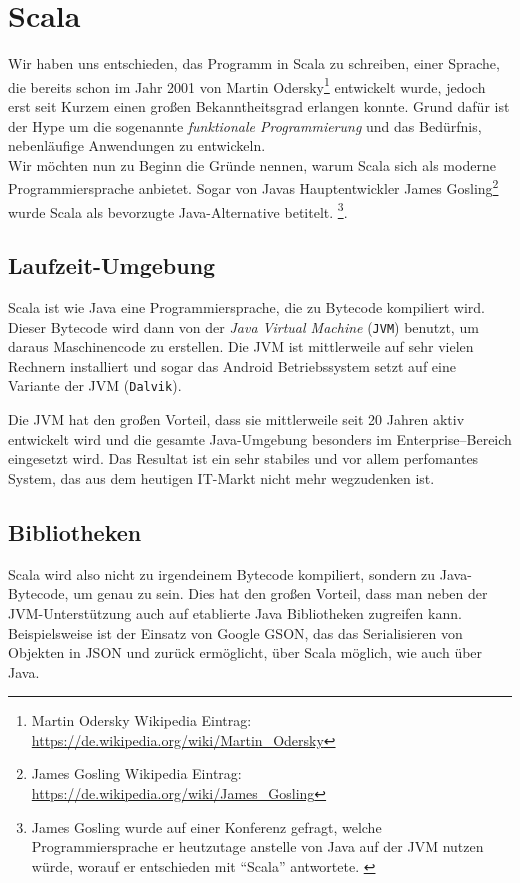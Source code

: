 \chapter{Scala}
Wir haben uns entschieden, das Programm in Scala zu schreiben, einer Sprache, die bereits schon im Jahr 2001 von Martin Odersky\footnote{Martin Odersky Wikipedia Eintrag: \url{https://de.wikipedia.org/wiki/Martin_Odersky}} entwickelt wurde, jedoch erst seit Kurzem einen großen Bekanntheitsgrad erlangen konnte. Grund dafür ist der Hype um die sogenannte \textit{funktionale Programmierung} und das Bedürfnis, nebenläufige Anwendungen zu entwickeln.\\
Wir möchten nun zu Beginn die Gründe nennen, warum Scala sich als moderne Programmiersprache anbietet. Sogar von Javas Hauptentwickler James Gosling\footnote{James Gosling Wikipedia Eintrag: \url{https://de.wikipedia.org/wiki/James_Gosling}} wurde Scala als bevorzugte Java-Alternative betitelt. \footnote{James Gosling wurde auf einer Konferenz gefragt, welche Programmiersprache er heutzutage anstelle von Java auf der JVM nutzen würde, worauf er entschieden mit ``Scala'' antwortete. \cite{BestJVMLanguageInterview}}.

\section{Laufzeit-Umgebung}
Scala ist wie Java eine Programmiersprache, die zu Bytecode kompiliert wird. Dieser Bytecode wird dann von der \textit{Java Virtual Machine} (\texttt{JVM}) benutzt, um daraus Maschinencode zu erstellen. Die JVM ist mittlerweile auf sehr vielen Rechnern installiert und sogar das Android Betriebssystem setzt auf eine Variante der JVM (\texttt{Dalvik}).

Die JVM hat den großen Vorteil, dass sie mittlerweile seit 20 Jahren aktiv entwickelt wird und die gesamte Java-Umgebung besonders im Enterprise--Bereich eingesetzt wird. Das Resultat ist ein sehr stabiles und vor allem perfomantes System, das aus dem heutigen IT-Markt nicht mehr wegzudenken ist.

\section{Bibliotheken}
Scala wird also nicht zu irgendeinem Bytecode kompiliert, sondern zu Java-Bytecode, um genau zu sein. Dies hat den großen Vorteil, dass man neben der JVM-Unterstützung auch auf etablierte Java Bibliotheken zugreifen kann. Beispielsweise ist der Einsatz von Google GSON, das das Serialisieren von Objekten in JSON und zurück ermöglicht, über Scala möglich, wie auch über Java.\cite{GoogleGSONProjektseite}

